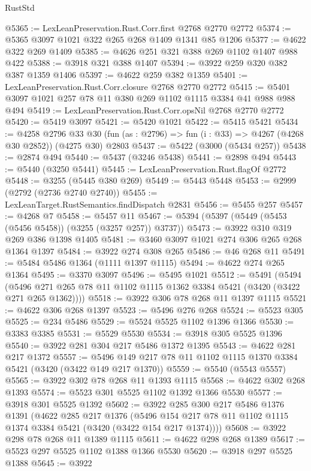 \begin{lexlean}{RustStd}
\begin{coremodule}
@5365 := LexLeanPreservation.Rust.Corr.first @2768 @2770 @2772
@5374 := @5365 @3097 @1021 @322 @265 @268 @1409 @1341 @85 @1206
@5377 := @4622 @322 @269 @1409
@5385 := @4626 @251 @321 @388 @269 @1102 @1407 @988 @422
@5388 := @3918 @321 @388 @1407
@5394 := @3922 @259 @320 @382 @387 @1359 @1406
@5397 := @4622 @259 @382 @1359
@5401 := LexLeanPreservation.Rust.Corr.closure @2768 @2770 @2772
@5415 := @5401 @3097 @1021 @257 @78 @11 @380 @269 @1102 @1115 @3384 @41 @988 @988 @494
@5419 := LexLeanPreservation.Rust.Corr.opsNil @2768 @2770 @2772
@5420 := @5419 @3097
@5421 := @5420 @1021
@5422 := @5415 @5421
@5434 := @4258
    @2796
    @33
    @30
    (fun (as : @2796) => fun (i : @33) => @4267 (@4268 @30 @2852))
    (@4275 @30)
    @2803
@5437 := @5422 (@3000 (@5434 @257))
@5438 := @2874 @494
@5440 := @5437 (@3246 @5438)
@5441 := @2898 @494
@5443 := @5440 (@3250 @5441)
@5445 := LexLeanPreservation.Rust.flagOf @2772
@5448 := @3255 (@5445 @380 @269)
@5449 := @5443 @5448
@5453 := @2999 (@2792 (@2736 @2740 @2740))
@5455 := LexLeanTarget.RustSemantics.findDispatch @2831
@5456 := @5455 @257
@5457 := @4268 @7
@5458 := @5457 @11
@5467 := @5394 (@5397 (@5449 (@5453 (@5456 @5458)) (@3255 (@3257 @257)) @3737))
@5473 := @3922 @310 @319 @269 @386 @1398 @1405
@5481 := @3460 @3097 @1021 @274 @306 @265 @268 @1364 @1397
@5484 := @3922 @274 @308 @265
@5486 := @46 @268 @11
@5491 := @5484 @5486 @1364 (@1111 @1397 @1115)
@5494 := @4622 @274 @265 @1364
@5495 := @3370 @3097
@5496 := @5495 @1021
@5512 := @5491
    (@5494 (@5496 @271 @265 @78 @11 @1102 @1115 @1362 @3384 @5421 (@3420 (@3422 @271 @265 @1362))))
@5518 := @3922 @306 @78 @268 @11 @1397 @1115
@5521 := @4622 @306 @268 @1397
@5523 := @5496 @276 @268
@5524 := @5523 @305
@5525 := @234 @5486
@5529 := @5524 @5525 @1102 @1396 @1366
@5530 := @3383 @3385
@5531 := @5529 @5530
@5534 := @3918 @305 @5525 @1396
@5540 := @3922 @281 @304 @217 @5486 @1372 @1395
@5543 := @4622 @281 @217 @1372
@5557 := @5496 @149 @217 @78 @11 @1102 @1115 @1370 @3384 @5421 (@3420 (@3422 @149 @217 @1370))
@5559 := @5540 (@5543 @5557)
@5565 := @3922 @302 @78 @268 @11 @1393 @1115
@5568 := @4622 @302 @268 @1393
@5574 := @5523 @301 @5525 @1102 @1392 @1366 @5530
@5577 := @3918 @301 @5525 @1392
@5602 := @3922
    @285
    @300
    @217
    @5486
    @1376
    @1391
    (@4622
      @285
      @217
      @1376
      (@5496 @154 @217 @78 @11 @1102 @1115 @1374 @3384 @5421 (@3420 (@3422 @154 @217 @1374))))
@5608 := @3922 @298 @78 @268 @11 @1389 @1115
@5611 := @4622 @298 @268 @1389
@5617 := @5523 @297 @5525 @1102 @1388 @1366 @5530
@5620 := @3918 @297 @5525 @1388
@5645 := @3922

\end{coremodule}
\end{lexlean}
